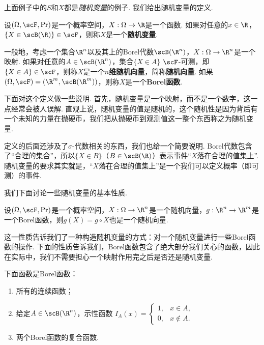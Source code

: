 上面例子中的$S$和$X$都是\emph{随机变量}的例子. 我们给出随机变量的定义. 

\begin{definition}
设$(\Omega,\scF,\Pr)$是一个概率空间，$X:\Omega\to\R$是一个函数. 如果对任意的$x\in\R$，$\{X\in\scB(\R)\}\in\scF$，则称$X$是一个\textbf{随机变量}. 

一般地，考虑一个集合$\R^n$以及其上的Borel代数$\scB(\R^n)$，$X:\Omega\to \R^n$是一个映射. 如果对任意的$A\in\scB(\R^n)$，集合$\{X\in A\}$ $\scF$-可测，即$\{X\in A\}\in\scF$，则称$X$是一个\textbf{$n$维随机向量}，简称\textbf{随机向量}. 如果$(\Omega,\scF)=(\R^m,\scB(\R^m))$，则称$X$是一个\textbf{Borel函数}.
\end{definition}

下面对这个定义做一些说明. 首先，随机变量是一个映射，而不是一个数字，这一点经常会被人误解. 直观上说，随机变量的值是随机的，这个随机性是因为背后有一个未知的力量在抛硬币，我们把从抛硬币到观测值这一整个东西称之为随机变量. 

定义的后面还涉及了$\sigma$-代数相关的东西，我们也给一个简要说明. Borel代数包含了“合理的集合”，所以$\{X\in B\}$（$B\in\scB(\R)$）表示事件“$X$落在合理的值集上”. 随机变量的要求其实就是，“$X$落在合理的值集上”是一个我们可以定义概率（即可测）的事件. 

我们下面讨论一些随机变量的基本性质. 

\begin{theorem}\label{thm:random-variable}
设$(\Omega,\scF,\Pr)$是一个概率空间，$X:\Omega\to\R^n$是一个随机向量，$g:\R^n\to\R^m$是一个Borel函数，则$g(X)=g\circ X$也是一个随机向量. 
\end{theorem}

这一性质告诉我们了一种构造随机变量的方式：对一个随机变量进行一些Borel函数的操作. 下面的性质告诉我们，Borel函数包含了绝大部分我们关心的函数，因此在实际中，我们不需要担心一个映射作用完之后是否还是随机变量.

\begin{proposition}\label{prop:borel-function}
下面函数是Borel函数：
\begin{enumerate}
    \item 所有的连续函数；
    \item 给定$A\in\scB(\R^n)$，示性函数
    $I_A(x) = \begin{cases}
        1, & x\in A,\\
        0, & x\notin A.
    \end{cases}$
    \item 两个Borel函数的复合函数. 
\end{enumerate}
\end{proposition}



